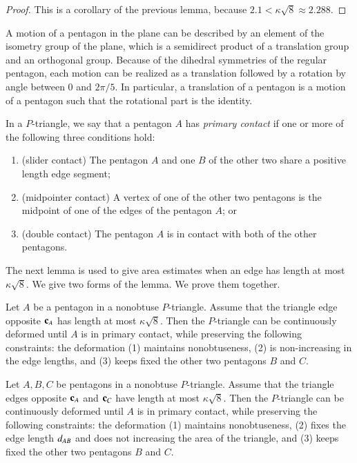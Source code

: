 \begin{proof}  
  This is a corollary of the previous lemma, because $2.1 <
  \kappa\sqrt8 \approx 2.288$.
\end{proof}

\begin{remark}
  A motion of a pentagon in the plane can be described by an element
  of the isometry group of the plane, which is a semidirect product of
  a translation group and an orthogonal group.  Because of the
  dihedral symmetries of the regular pentagon, each motion can be
  realized as a translation followed by a rotation by angle between
  $0$ and $2\pi/5$.  In particular, a translation of a pentagon is a
  motion of a pentagon such that the rotational part is the identity.
\end{remark}


\begin{definition}
In a $P$-triangle, we say that a pentagon $A$ has {\it primary
  contact} if one or more of the following three conditions hold:
\begin{enumerate}
\item (slider contact) The pentagon $A$ and one $B$ of the other two
   share a positive length edge segment;
\item (midpointer contact) A vertex of one of the other two pentagons
  is the midpoint of one of the edges of the pentagon $A$; or
\item (double contact) The pentagon $A$ is in contact with both of the
  other pentagons.
\end{enumerate}
\end{definition}

The next lemma is used to give area estimates when an edge has length
at most $\kappa\sqrt{8}$.  We give two forms of the lemma.  We prove
them together.

\begin{lemma} 
  Let $A$ be a pentagon in a nonobtuse $P$-triangle.  Assume that the
  triangle edge opposite ${\mathbf c}_A$ has length at most $\kappa\sqrt{8}$.
  Then the $P$-triangle can be continuously deformed until $A$ is in
  primary contact, while preserving the following constraints: the
  deformation (1) maintains nonobtuseness, (2) is non-increasing in
  the edge lengths, and (3) keeps fixed the other two pentagons $B$
  and $C$.
\end{lemma}

\begin{lemma} 
  Let $A,B,C$ be pentagons in a nonobtuse $P$-triangle.  Assume that
  the triangle edges opposite ${\mathbf c}_A$ and ${\mathbf c}_C$ have length at most
  $\kappa\sqrt{8}$.  Then the $P$-triangle can be continuously
  deformed until $A$ is in primary contact, while preserving the
  following constraints: the deformation (1) maintains nonobtuseness,
  (2) fixes the edge length $d_{AB}$ and does not increasing the area
  of the triangle, and (3) keeps fixed the other two pentagons $B$ and
  $C$.
\end{lemma}

